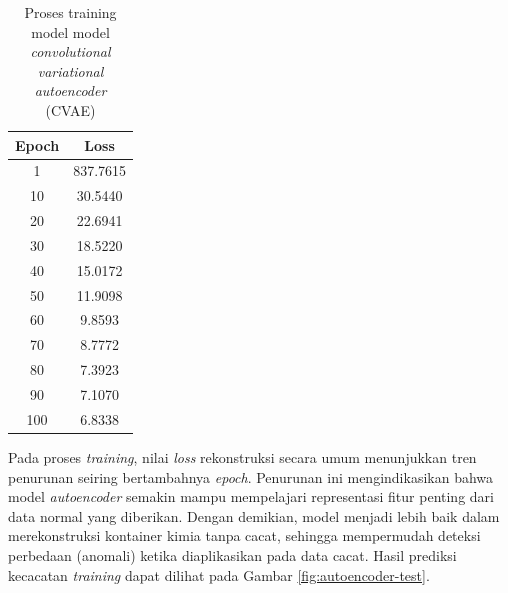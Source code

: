 \begin{table}[H]
  \caption{Proses training model model \textit{convolutional
  variational autoencoder} (CVAE)}
  \label{tab:training-autoencoder}
  \vspace{-1em}
  \centering
  \begin{tabular}{cc}
    \toprule
    \textbf{Epoch} & \textbf{Loss} \\
    \midrule
    1 & 837.7615 \\
    10 & 30.5440 \\
    20 & 22.6941 \\
    30 & 18.5220 \\
    40 & 15.0172 \\
    50 & 11.9098 \\
    60 & 9.8593 \\
    70 & 8.7772 \\
    80 & 7.3923 \\
    90 & 7.1070 \\
    100 & 6.8338 \\
    \bottomrule
  \end{tabular}
\end{table}

Pada proses \textit{training}, nilai \textit{loss} rekonstruksi
secara umum menunjukkan tren penurunan seiring bertambahnya
\textit{epoch}. Penurunan ini mengindikasikan bahwa model \textit{autoencoder}
semakin mampu mempelajari representasi fitur penting dari data normal
yang diberikan. Dengan demikian, model menjadi lebih baik dalam
merekonstruksi kontainer kimia tanpa cacat, sehingga mempermudah
deteksi perbedaan (anomali) ketika diaplikasikan pada data cacat.
Hasil prediksi kecacatan \textit{training} dapat dilihat
pada Gambar \ref{fig:autoencoder-test}.

